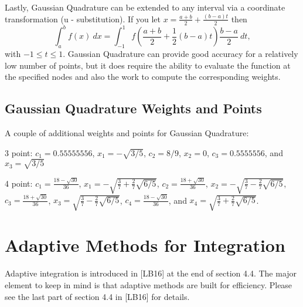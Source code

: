 \documentclass[twoside]{article}
\renewcommand{\cite}[1]{[#1]}
\def\ds{\displaystyle}
\begin{document}
Lastly, Gaussian Quadrature can be extended to any interval via a coordinate transformation (u - substitution). If you let $\ds x = \frac {a+b}2 + \frac {(b-a)t}2$ then 
$$\int_a^b f(x) \ dx = \int_{-1}^1 f\left( \frac {a+b}2 + \frac 12(b-a)t \right) \frac {b-a}2 \ dt,$$
with $\ds -1\le t \le 1$. Gaussian Quadrature can provide good accuracy for a relatively low number of points, but it does require the ability to evaluate the function at the specified nodes and also the work to compute the corresponding weights. 

\subsection{Gaussian Quadrature Weights and Points}
A couple of additional weights and points for Gaussian Quadrature:

3 point: $\ds c_1 = 0.55555556$, $\ds x_1 = - \sqrt{3/5}$, $\ds c_2=8/9$, $\ds x_2=0$, $\ds c_3 = 0.5555556$, and $\ds x_3 = \sqrt{3/5}$

4 point: $\ds c_1 = \frac{18-\sqrt{30}}{36}$, $\ds x_1 = - \sqrt{\frac 37 + \frac 27 \sqrt{6/5}}$, $\ds c_2=\frac{18+\sqrt{30}}{36}$, $\ds x_2=  - \sqrt{\frac 37 - \frac 27 \sqrt{6/5}}$, $\ds c_3 = \frac{18+\sqrt{30}}{36} $, $\ds x_3 = \sqrt{\frac 37 - \frac 27 \sqrt{6/5}}$, $\ds c_4 = \frac{18-\sqrt{30}}{36}$, and $\ds x_4 = \sqrt{\frac 37 + \frac 27 \sqrt{6/5}}$.

\section{Adaptive Methods for Integration}
Adaptive integration is introduced in \cite{LB16} at the end of section 4.4. The major element to keep in mind is that adaptive methods are built for efficiency. Please see the last part of section 4.4 in \cite{LB16} for details. 
\end{document}
